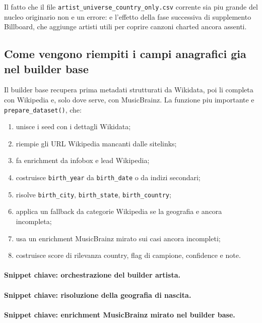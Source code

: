 \documentclass[11pt]{article}
\begin{document}
Il fatto che il file \texttt{artist\_universe\_country\_only.csv} corrente sia piu grande del nucleo originario non e un errore: e l'effetto della fase successiva di supplemento Billboard, che aggiunge artisti utili per coprire canzoni charted ancora assenti.

\subsection{Come vengono riempiti i campi anagrafici gia nel builder base}
Il builder base recupera prima metadati strutturati da Wikidata, poi li completa con Wikipedia e, solo dove serve, con MusicBrainz. La funzione piu importante e \texttt{prepare\_dataset()}, che:
\begin{enumerate}[leftmargin=2em]
\item unisce i seed con i dettagli Wikidata;
\item riempie gli URL Wikipedia mancanti dalle sitelinks;
\item fa enrichment da infobox e lead Wikipedia;
\item costruisce \texttt{birth\_year} da \texttt{birth\_date} o da indizi secondari;
\item risolve \texttt{birth\_city}, \texttt{birth\_state}, \texttt{birth\_country};
\item applica un fallback da categorie Wikipedia se la geografia e ancora incompleta;
\item usa un enrichment MusicBrainz mirato sui casi ancora incompleti;
\item costruisce score di rilevanza country, flag di campione, confidence e note.
\end{enumerate}

\paragraph{Snippet chiave: orchestrazione del builder artista.}


\paragraph{Snippet chiave: risoluzione della geografia di nascita.}


\paragraph{Snippet chiave: enrichment MusicBrainz mirato nel builder base.}

\end{document}
